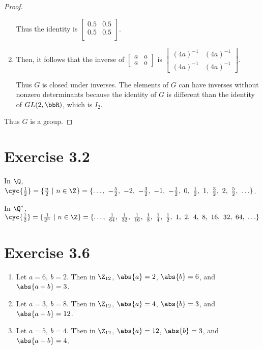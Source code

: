 \documentclass{article}
\begin{document}
\begin{proof}
\begin{enumerate}[label=(\roman*)]
            Thus the identity is \(\begin{bmatrix}
                0.5 & 0.5 \\
                0.5 & 0.5 \\
            \end{bmatrix}\).
        \item Then, it follows that the inverse of \(\begin{bmatrix}
            a & a \\
            a & a
        \end{bmatrix}\) is \(\begin{bmatrix}
            (4a)^{-1} & (4a)^{-1} \\
            (4a)^{-1} & (4a)^{-1}
        \end{bmatrix}\).

        Thus \(G\) is closed under inverses. The elements of \(G\) can have inverses without nonzero determinants because the identity of \(G\) is different than the identity of \(GL(2, \bbR)\), which is \(I_2\).
    \end{enumerate}

    Thus \(G\) is a group.
\end{proof}

\section*{Exercise 3.2}
In \(\Q\), \(\cyc{\frac{1}{2}} = \{\frac{n}{2}\ \vert\ n\in\Z\} = \{\ldots,\ -\frac{5}{2},\ -2,\ -\frac{3}{2},\ -1,\ -\frac{1}{2},\ 0,\ \frac{1}{2},\ 1,\ \frac{3}{2},\ 2,\ \frac{5}{2},\ \ldots\}\).

In \(\Q^*\), \(\cyc{\frac{1}{2}} = \{\frac{1}{2^n}\ \vert\ n\in\Z\} = \{\ldots,\ \frac{1}{64},\ \frac{1}{32},\ \frac{1}{16},\ \frac{1}{8},\ \frac{1}{4},\ \frac{1}{2},\ 1,\ 2,\ 4,\ 8,\ 16,\ 32,\ 64,\ \ldots\}\)

\section*{Exercise 3.6}
\begin{enumerate}[label=\alph*)]
    \item Let \(a=6,\ b=2\). Then in \(\Z_{12}\), \(\abs{a}=2\), \(\abs{b}=6\), and \(\abs{a+b}=3\).
    \item Let \(a=3,\ b=8\). Then in \(\Z_{12}\), \(\abs{a}=4\), \(\abs{b}=3\), and \(\abs{a+b}=12\).
    \item Let \(a=5,\ b=4\). Then in \(\Z_{12}\), \(\abs{a}=12\), \(\abs{b}=3\), and \(\abs{a+b}=4\).
\end{enumerate}
\end{document}
